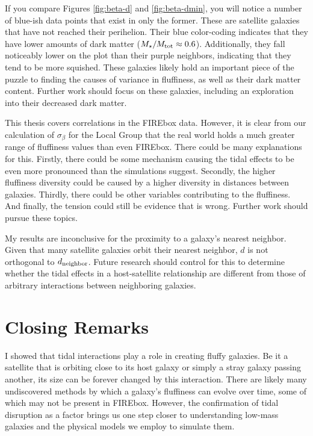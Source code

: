 If you compare Figures \ref{fig:beta-d} and \ref{fig:beta-dmin}, you will notice a number of blue-ish data points that exist in only the former. These are satellite galaxies that have not reached their perihelion. Their blue color-coding indicates that they have lower amounts of dark matter ($M_\star / M_{\rm{tot}} \approx 0.6$). Additionally, they fall noticeably lower on the plot than their purple neighbors, indicating that they tend to be more squished. These galaxies likely hold an important piece of the puzzle to finding the causes of variance in fluffiness, as well as their dark matter content. Further work should focus on these galaxies, including an exploration into their decreased dark matter.

This thesis covers correlations in the FIREbox data. However, it is clear from our calculation of $\sigma_\beta$ for the Local Group that the real world holds a much greater range of fluffiness values than even FIREbox. There could be many explanations for this. Firstly, there could be some mechanism causing the tidal effects to be even more pronounced than the simulations suggest. Secondly, the higher fluffiness diversity could be caused by a higher diversity in distances between galaxies. Thirdly, there could be other variables contributing to the fluffiness. And finally, the tension could still be evidence that \lcdm\* is wrong. Further work should pursue these topics.

My results are inconclusive for the proximity to a galaxy's nearest neighbor. Given that many satellite galaxies orbit their nearest neighbor, $d$ is not orthogonal to $d_{\rm{neighbor}}$. Future research should control for this to determine whether the tidal effects in a host-satellite relationship are different from those of arbitrary interactions between neighboring galaxies.

\section{Closing Remarks}

I showed that tidal interactions play a role in creating fluffy galaxies. Be it a satellite that is orbiting close to its host galaxy or simply a stray galaxy passing another, its size can be forever changed by this interaction. There are likely many undiscovered methods by which a galaxy's fluffiness can evolve over time, some of which may not be present in FIREbox. However, the confirmation of tidal disruption as a factor brings us one step closer to understanding low-mass galaxies and the physical models we employ to simulate them.